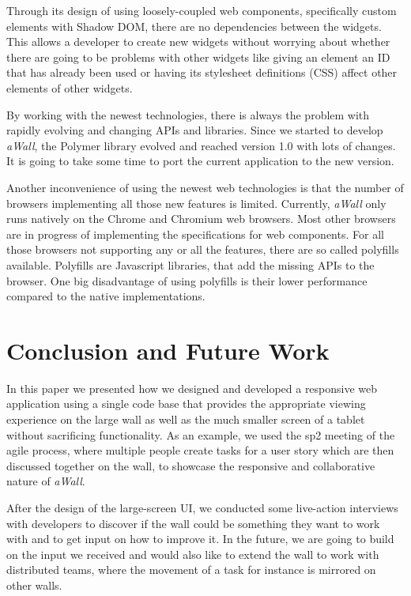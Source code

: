 \documentclass{sigchi}
\begin{document}
Through its design of using loosely-coupled web components, specifically custom elements with Shadow DOM, there are no dependencies between the widgets.
This allows a developer to create new widgets without worrying about whether there are going to be problems with other widgets like  giving an element an ID that has already been used or having its stylesheet definitions (CSS) affect other elements of other widgets.

By working with the newest technologies, there is always the problem with rapidly evolving and changing APIs and libraries.
Since we started to develop \textit{aWall}, the Polymer library evolved and reached version 1.0 with lots of changes.
It is going to take some time to port the current application to the new version. 

Another inconvenience of using the newest web technologies is that the number of browsers implementing all those new features is limited.
Currently, \textit{aWall} only runs natively on the Chrome and Chromium web browsers.
Most other browsers are in progress of implementing the specifications for web components.
For all those browsers not supporting any or all the features, there are so called polyfills available.
Polyfills are Javascript libraries, that add the missing APIs to the browser.
One big disadvantage of using polyfills is their lower performance compared to the native implementations.


\section{Conclusion and Future Work}
In this paper we presented how we designed and developed a responsive web application using a single code base that provides the appropriate viewing experience on the large wall as well as the much smaller screen of a tablet without sacrificing functionality.
As an example, we used the \gls{sp2} meeting of the agile process, where multiple people create tasks for a user story which are then discussed together on the wall, to showcase the responsive and collaborative nature of \textit{aWall}.

After the design of the large-screen UI, we conducted some live-action interviews with developers to discover if the wall could be something they want to work with and to get input on how to improve it.
In the future, we are going to build on the input we received and would also like to extend the wall to work with distributed teams, where the movement of a task for instance is mirrored on other walls.


\balance{}



\end{document}
